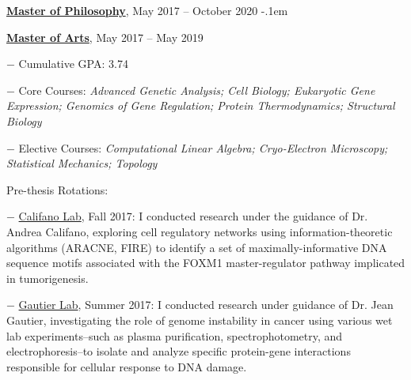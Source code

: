 \documentclass[10pt]{article}
\newcommand{\blankline}{\quad\pagebreak[3]}
\begin{document}
\begin{outerlist}
	\item[] \href{https://www.parchment.com/u/award/d0de207f1d8ffa3a274d652565bdfad7} {\textbf{Master of Philosophy}}, May 2017 -- October 2020
	\itemsep-.1em
	\item[] \href{https://www.parchment.com/u/award/a8d324b4c360c0a6dcb5ea11eda0a2ec} {\textbf{Master of Arts}}, May 2017 -- May 2019

		\begin{innerlist}
			\item [$-$] Cumulative GPA: 3.74
			\item [$-$] Core Courses: \emph{Advanced Genetic Analysis; Cell Biology; Eukaryotic Gene Expression; Genomics of Gene Regulation; Protein Thermodynamics; Structural Biology}
			\item [$-$] Elective Courses: \emph{Computational Linear Algebra; Cryo-Electron Microscopy; Statistical Mechanics; Topology}
		\end{innerlist}
	
	\item [] Pre-thesis Rotations:
	\begin{innerlist}
	\item [$-$] \href{http://califano.c2b2.columbia.edu/} {Califano Lab}, Fall 2017: I conducted research under the guidance of Dr. Andrea Califano, exploring cell regulatory networks using information-theoretic algorithms (ARACNE, FIRE) to identify a set of maximally-informative DNA sequence motifs associated with the FOXM1 master-regulator pathway implicated in tumorigenesis.
	\item [$-$] \href{https://www.gautierlab.org/} {Gautier Lab}, Summer 2017: I conducted research under guidance of Dr. Jean Gautier, investigating the role of genome instability in cancer using various wet lab experiments--such as plasma purification, spectrophotometry, and electrophoresis--to isolate and analyze specific protein-gene interactions responsible for cellular response to DNA damage.
\end{innerlist}

	\end{outerlist}

	\blankline
\end{document}
